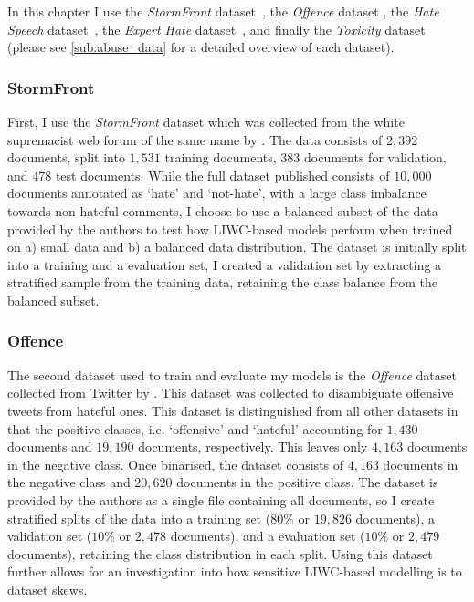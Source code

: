 In this chapter I use the \textit{StormFront} dataset~\citep{Garcia:2019}, the \textit{Offence} dataset \citep{Davidson:2017}, the \textit{Hate Speech} dataset~\citep{Waseem-Hovy:2016}, the \textit{Expert Hate} dataset~\citep{Waseem:2016}, and finally the \textit{Toxicity} dataset~\citep{Wulczyn:2017} (please see \cref{sub:abuse_data} for a detailed overview of each dataset).

\subsubsection{StormFront}
First, I use the \textit{StormFront} dataset which was collected from the white supremacist web forum of the same name by \citet{Garcia:2019}. The data consists of $2,392$ documents, split into $1,531$ training documents, $383$ documents for validation, and $478$ test documents. While the full dataset published consists of $10,000$ documents annotated as `hate' and `not-hate', with a large class imbalance towards non-hateful comments, I choose to use a balanced subset of the data provided by the authors to test how LIWC-based models perform when trained on a) small data and b) a balanced data distribution.
The dataset is initially split into a training and a evaluation set, I created a validation set by extracting a stratified sample from the training data, retaining the class balance from the balanced subset.

\subsubsection{Offence}
The second dataset used to train and evaluate my models is the \textit{Offence} dataset collected from Twitter by \citet{Davidson:2017}. This dataset was collected to disambiguate offensive tweets from hateful ones. This dataset is distinguished from all other datasets in that the positive classes, i.e. `offensive' and `hateful' accounting for $1,430$ documents and $19,190$ documents, respectively. This leaves only $4,163$ documents in the negative class. Once binarised, the dataset consists of $4,163$ documents in the negative class and $20,620$ documents in the positive class. The dataset is provided by the authors as a single file containing all documents, so I create stratified splits of the data into a training set ($80\%$ or $19,826$ documents), a validation set ($10\%$ or $2,478$ documents), and a evaluation set ($10\%$ or $2,479$ documents), retaining the class distribution in each split. Using this dataset further allows for an investigation into how sensitive LIWC-based modelling is to dataset skews.

